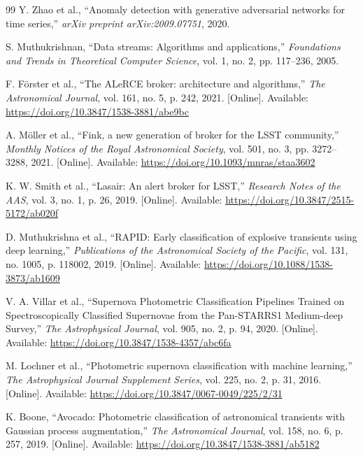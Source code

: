 \documentclass[10pt,journal,compsoc]{IEEEtran}
\begin{document}
\begin{thebibliography}{99}
Y. Zhao et al., ``Anomaly detection with generative adversarial networks for time series,'' \emph{arXiv preprint arXiv:2009.07751}, 2020.

S. Muthukrishnan, ``Data streams: Algorithms and applications,'' \emph{Foundations and Trends in Theoretical Computer Science}, vol. 1, no. 2, pp. 117--236, 2005.

F. F\"{o}rster et al., ``The ALeRCE broker: architecture and algorithms,'' \emph{The Astronomical Journal}, vol. 161, no. 5, p. 242, 2021. [Online]. Available: \url{https://doi.org/10.3847/1538-3881/abe9bc}

A. M\"{o}ller et al., ``Fink, a new generation of broker for the LSST community,'' \emph{Monthly Notices of the Royal Astronomical Society}, vol. 501, no. 3, pp. 3272--3288, 2021. [Online]. Available: \url{https://doi.org/10.1093/mnras/staa3602}

K. W. Smith et al., ``Lasair: An alert broker for LSST,'' \emph{Research Notes of the AAS}, vol. 3, no. 1, p. 26, 2019. [Online]. Available: \url{https://doi.org/10.3847/2515-5172/ab020f}

D. Muthukrishna et al., ``RAPID: Early classification of explosive transients using deep learning,'' \emph{Publications of the Astronomical Society of the Pacific}, vol. 131, no. 1005, p. 118002, 2019. [Online]. Available: \url{https://doi.org/10.1088/1538-3873/ab1609}

V. A. Villar et al., ``Supernova Photometric Classification Pipelines Trained on Spectroscopically Classified Supernovae from the Pan-STARRS1 Medium-deep Survey,'' \emph{The Astrophysical Journal}, vol. 905, no. 2, p. 94, 2020. [Online]. Available: \url{https://doi.org/10.3847/1538-4357/abc6fa}

M. Lochner et al., ``Photometric supernova classification with machine learning,'' \emph{The Astrophysical Journal Supplement Series}, vol. 225, no. 2, p. 31, 2016. [Online]. Available: \url{https://doi.org/10.3847/0067-0049/225/2/31}

K. Boone, ``Avocado: Photometric classification of astronomical transients with Gaussian process augmentation,'' \emph{The Astronomical Journal}, vol. 158, no. 6, p. 257, 2019. [Online]. Available: \url{https://doi.org/10.3847/1538-3881/ab5182}


\end{thebibliography}
\end{document}
